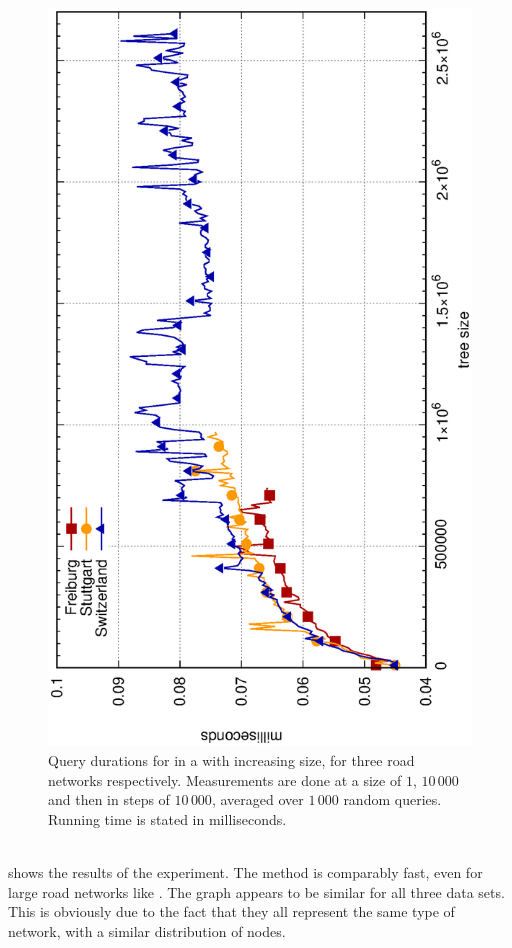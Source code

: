 	\begin{figure}[!ht]
		 \begin{center}
			\includegraphics[scale=0.55,angle=-90]{res/plots/coverTreeResults}
		\end{center}
		\caption{Query durations for  in a \coverTree with increasing size,
		for three road networks respectively. Measurements are done at a size of $1$, $10\,000$ and then in steps
		of $10\,000$, averaged over $1\,000$ random queries. Running time is stated in milliseconds.}
		\label{coverTreeResults}
	\end{figure}\quad\\
	 shows the results of the experiment. The method is comparably fast, even for large road
	networks like \switzerlandR. The graph appears to be similar for all three data sets. This is obviously due to the fact that
	they all represent the same type of network, with a similar distribution of nodes.
	
